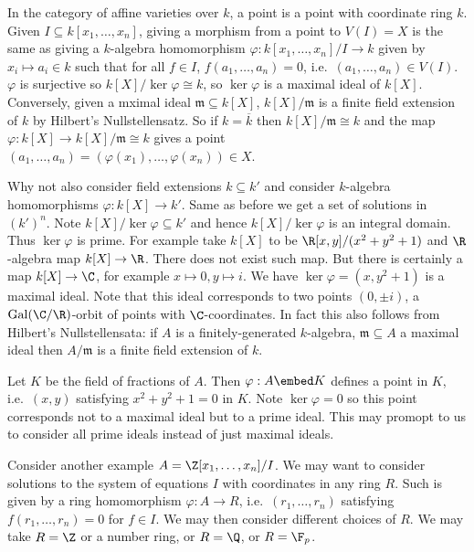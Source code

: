 \documentclass[a4paper]{article}
\begin{document}
In the category of affine varieties over \(k\), a point is a point with coordinate ring \(k\). Given \(I \subseteq k[x_1, \dots, x_n]\), giving a morphism from a point to \(V(I) = X\) is the same as giving a \(k\)-algebra homomorphism \(\varphi: k[x_1, \dots, x_n]/I \to k\) given by \(x_i \mapsto a_i \in k\) such that for all \(f \in I\), \(f(a_1, \dots, a_n) = 0\), i.e.\ \((a_1, \dots, a_n) \in V(I)\). \(\varphi\) is surjective so \(k[X]/\ker \varphi \cong k\), so \(\ker \varphi\) is a maximal ideal of \(k[X]\). Conversely, given a mximal ideal \(\mathfrak m \subseteq k[X]\), \(k[X]/\mathfrak m\) is a finite field extension of \(k\) by Hilbert's Nullstellensatz. So if \(k = \overline k\) then \(k[X]/\mathfrak m \cong k\) and the map \(\varphi: k[X] \to k[X]/\mathfrak m \cong k\) gives a point \((a_1, \dots, a_n) = (\varphi(x_1), \dots, \varphi(x_n)) \in X\).

Why not also consider field extensions \(k \subseteq k'\) and consider \(k\)-algebra homomorphisms \(\varphi: k[X] \to k'\). Same as before we get a set of solutions in \((k')^n\). Note \(k[X]/\ker \varphi \subseteq k'\) and hence \(k[X]/\ker \varphi\) is an integral domain. Thus \(\ker \varphi\) is prime. For example take \(k[X]\) to be \(\R[x, y]/(x^2 + y^2 + 1)\) and \(\R\)-algebra map \(k[X] \to \R\). There does not exist such map. But there is certainly a map \(k[X] \to \C\), for example \(x \mapsto 0, y \mapsto i\). We have \(\ker \varphi = (x, y^2 + 1)\) is a maximal ideal. Note that this ideal corresponds to two points \((0, \pm i)\), a \(\operatorname{Gal}(\C/\R)\)-orbit of points with \(\C\)-coordinates. In fact this also follows from Hilbert's Nullstellensata: if \(A\) is a finitely-generated \(k\)-algebra, \(\mathfrak m \subseteq A\) a maximal ideal then \(A/\mathfrak m\) is a finite field extension of \(k\).

Let \(K\) be the field of fractions of \(A\). Then \(\varphi: A \embed K\) defines a point in \(K\), i.e.\ \((x, y)\) satisfying \(x^2 + y^2 + 1 = 0\) in \(K\). Note \(\ker \varphi = 0\) so this point corresponds not to a maximal ideal but to a prime ideal. This may promopt to us to consider all prime ideals instead of just maximal ideals.

Consider another example \(A = \Z[x_1, \dots, x_n]/I\). We may want to consider solutions to the system of equations \(I\) with coordinates in any ring \(R\). Such is given by a ring homomorphism \(\varphi: A \to R\), i.e.\ \((r_1, \dots, r_n)\) satisfying \(f(r_1, \dots, r_n) = 0\) for \(f \in I\). We may then consider different choices of \(R\). We may take \(R = \Z\) or a number ring, or \(R = \Q\), or \(R = \F_p\).
\end{document}
